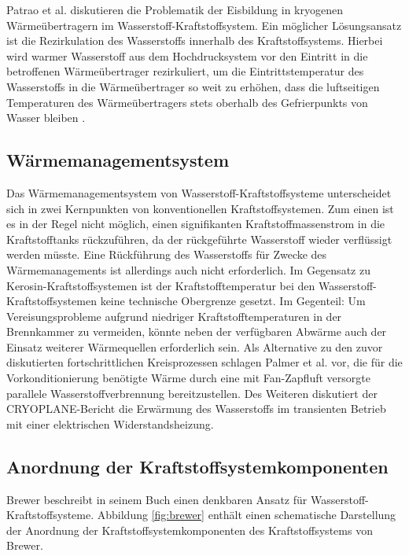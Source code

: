 Patrao et al. \cite{Patrao.2024} diskutieren die Problematik der Eisbildung in kryogenen Wärmeübertragern im Wasserstoff-Kraftstoffsystem. Ein möglicher Lösungsansatz ist die Rezirkulation des Wasserstoffs innerhalb des Kraftstoffsystems. Hierbei wird warmer Wasserstoff aus dem Hochdrucksystem vor den Eintritt in die betroffenen Wärmeübertrager rezirkuliert, um die Eintrittstemperatur des Wasserstoffs in die Wärmeübertrager so weit zu erhöhen, dass die luftseitigen Temperaturen des Wärmeübertragers stets oberhalb des Gefrierpunkts von Wasser bleiben \cite{Brewer.1991}. 

\subsection{Wärmemanagementsystem}

Das Wärmemanagementsystem von Wasserstoff-Kraftstoffsysteme unterscheidet sich in zwei Kernpunkten von konventionellen Kraftstoffsystemen. Zum einen ist es in der Regel nicht möglich, einen signifikanten Kraftstoffmassenstrom in die Kraftstofftanks rückzuführen, da der rückgeführte Wasserstoff wieder verflüssigt werden müsste. Eine Rückführung des Wasserstoffs für Zwecke des Wärmemanagements ist allerdings auch nicht erforderlich. Im Gegensatz zu Kerosin-Kraftstoffsystemen ist der Kraftstofftemperatur bei den Wasserstoff-Kraftstoffsystemen keine technische Obergrenze gesetzt. Im Gegenteil: Um Vereisungsprobleme aufgrund niedriger Kraftstofftemperaturen in der Brennkammer zu vermeiden, könnte neben der verfügbaren Abwärme auch der Einsatz weiterer Wärmequellen erforderlich sein. Als Alternative zu den zuvor diskutierten fortschrittlichen Kreisprozessen schlagen Palmer et al. \cite{PalmerChloeJWhurrJohnR.2024} vor, die für die Vorkonditionierung benötigte Wärme durch eine mit Fan-Zapfluft versorgte parallele Wasserstoffverbrennung bereitzustellen. Des Weiteren diskutiert der CRYOPLANE-Bericht \cite{Scholz.2003} die Erwärmung des Wasserstoffs im transienten Betrieb mit einer elektrischen Widerstandsheizung.

\subsection{Anordnung der Kraftstoffsystemkomponenten}

Brewer \cite{Brewer.1991} beschreibt in seinem Buch einen denkbaren Ansatz für Wasserstoff-Kraftstoffsysteme. Abbildung \ref{fig:brewer} enthält einen schematische Darstellung der Anordnung der Kraftstoffsystemkomponenten des Kraftstoffsystems von Brewer.


